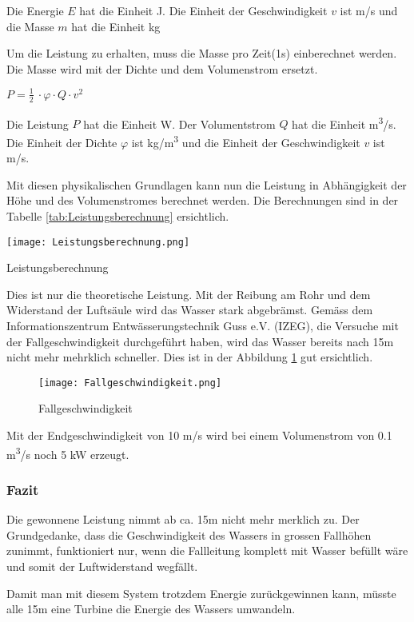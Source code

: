 Die Energie \(E\) hat die Einheit \si{J}. Die Einheit der Geschwindigkeit \(v\) ist \si{m/s} und die Masse \(m\) hat die Einheit \si{kg}

Um die Leistung zu erhalten, muss die Masse pro Zeit(1s) einberechnet werden. Die Masse wird  mit der Dichte und dem Volumenstrom ersetzt.

\begin{center}
\(P =\frac 12\ \cdot \varphi \cdot Q \cdot v^2\)
\end{center}

Die Leistung \(P\) hat die Einheit \si{W}. Der Volumentstrom \(Q\) hat die Einheit \si{m^3/s}. Die Einheit der Dichte \(\varphi\) ist \si{kg/m^3} und die Einheit der Geschwindigkeit \(v\) ist \si{m/s}.

\bigskip


Mit diesen physikalischen Grundlagen kann nun die Leistung in Abhängigkeit der Höhe und des Volumenstromes berechnet werden.  Die Berechnungen sind in der Tabelle  \ref{tab:Leistungsberechnung}  ersichtlich.

\begin{table} [H]
	\centering
	\texttt{[image: Leistungsberechnung.png]}
	\caption{Leistungsberechnung}
	\label{tab:Leistungsberechnung}
\end{table}

\newpage

Dies ist nur die theoretische Leistung. Mit der Reibung am Rohr und dem Widerstand der Luftsäule wird das Wasser stark abgebrämst. Gemäss dem Informationszentrum Entwässerungstechnik Guss e.V. (IZEG), die Versuche mit der Fallgeschwindigkeit durchgeführt haben, wird das Wasser bereits nach 15\si{m} nicht mehr mehrklich schneller. Dies ist in der Abbildung \ref{fig:Fallgeschwindigkeit}  gut ersichtlich.

\begin{figure} [H]
	\centering
	\texttt{[image: Fallgeschwindigkeit.png]}
	\caption{Fallgeschwindigkeit}
	\label{fig:Fallgeschwindigkeit}
\end{figure}


Mit der Endgeschwindigkeit von 10 \si{m/s} wird bei einem Volumenstrom von 0.1 \si{m^3/s} noch 5 \si{kW} erzeugt.

\subsubsection{Fazit}

Die gewonnene Leistung nimmt ab ca. 15\si{m} nicht mehr merklich zu. Der Grundgedanke, dass die Geschwindigkeit des Wassers in grossen Fallhöhen zunimmt, funktioniert nur, wenn die Fallleitung komplett mit Wasser befüllt wäre und somit der Luftwiderstand wegfällt.

Damit man mit diesem System trotzdem Energie zurückgewinnen kann, müsste alle 15\si{m} eine Turbine die Energie des Wassers umwandeln.

\clearpage 





